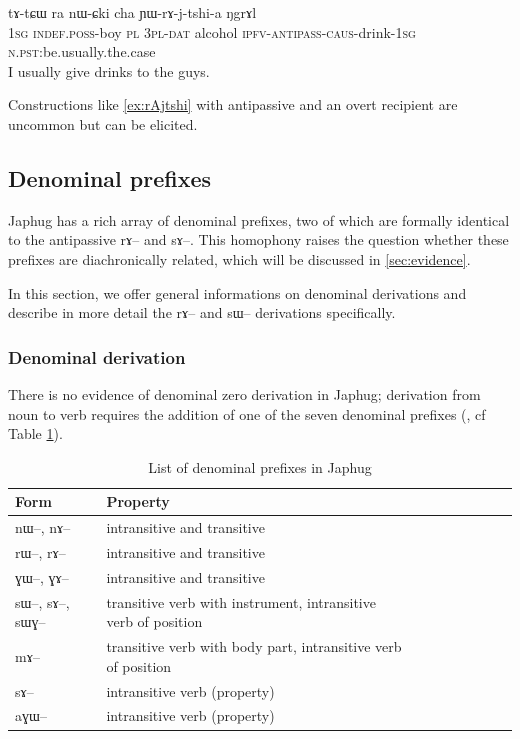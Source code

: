 \documentclass[oldfontcommands,oneside,a4paper,11pt]{article}
\newcommand{\ipa}[1]{{\phon \mbox{#1}}} %
\begin{document}
   \begin{exe} 
\ex \label{ex:rAjtshi}
\gll \ipa{aʑo} 	\ipa{tɤ-tɕɯ} 	\ipa{ra} 	\ipa{nɯ-ɕki} 	\ipa{cha} 	\ipa{ɲɯ-rɤ-j-tshi-a} 	\ipa{ŋgrɤl} \\
   1\textsc{sg} \textsc{indef.poss}-boy \textsc{pl} 3\textsc{pl-dat} alcohol \textsc{ipfv-antipass-caus}-drink-\textsc{1sg} \textsc{n.pst}:be.usually.the.case     \\
 \glt     I usually give drinks to the guys.
\end{exe} 
 Constructions like \ref{ex:rAjtshi} with antipassive and an overt recipient are uncommon but can be elicited.  
 

\subsection{Denominal prefixes} \label{subsec:other}
Japhug has a rich array of denominal prefixes, two of which are formally identical to the antipassive \ipa{rɤ}-- and \ipa{sɤ}--. This homophony raises the question whether these prefixes are diachronically related, which will be discussed in \ref{sec:evidence}. 

In this section, we offer general informations on denominal derivations  and describe in more detail the \ipa{rɤ}-- and \ipa{sɯ}-- derivations specifically.

\subsubsection{Denominal derivation } \label{subsubsec:denominal}
There is no  evidence of denominal zero derivation in Japhug; derivation from noun to verb requires the addition of one of the seven denominal prefixes (\citealt[1217]{jacques12incorp}, cf Table \ref{tab:denom.pref}).

\begin{table}[H] \centering
\caption{List of denominal prefixes in Japhug}\label{tab:denom.pref} 
\begin{tabular}{lllllllll} \toprule
Form& Property \\
\midrule
\ipa{nɯ}--, \ipa{nɤ}-- & intransitive and transitive \\
\ipa{rɯ}--, \ipa{rɤ}-- & intransitive and transitive \\
\ipa{ɣɯ}--, \ipa{ɣɤ}-- & intransitive and transitive \\
\ipa{sɯ}--, \ipa{sɤ}--, \ipa{sɯɣ}--  & transitive verb with instrument, intransitive verb of position \\
\ipa{mɤ}-- & transitive verb with body part, intransitive verb of position \\
\ipa{sɤ}-- & intransitive verb (property) \\
\ipa{aɣɯ}-- & intransitive verb (property) \\
    \bottomrule
\end{tabular}
\end{table}
\end{document}
